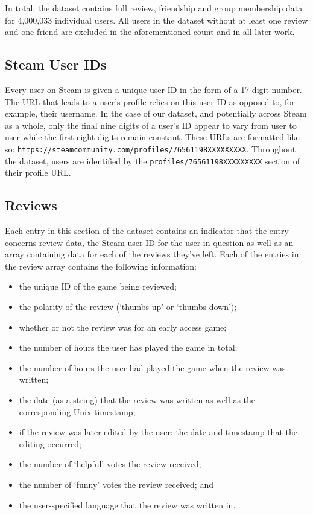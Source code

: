In total, the dataset contains full review, friendship and group membership data for 4,000,033 individual users. All users in the dataset without at least one review and one friend are excluded in the aforementioned count and in all later work.

\subsection{Steam User IDs} \label{sec:BG_Dataset_UIDs}

Every user on Steam is given a unique user ID in the form of a 17 digit number. The URL that leads to a user's profile relies on this user ID as opposed to, for example, their username. In the case of our dataset, and potentially across Steam as a whole, only the final nine digits of a user's ID appear to vary from user to user while the first eight digits remain constant. These URLs are formatted like so:  \texttt{https://steamcommunity.com/profiles/76561198XXXXXXXXX}. Throughout the dataset, users are identified by the \texttt{profiles/76561198XXXXXXXXX} section of their profile URL.

\subsection{Reviews} \label{sec:BG_Dataset_Revs}

Each entry in this section of the dataset contains an indicator that the entry concerns review data, the Steam user ID for the user in question as well as an array containing data for each of the reviews they've left. Each of the entries in the review array contains the following information:

\begin{itemize}
    \item the unique ID of the game being reviewed;
    \item the polarity of the review (`thumbs up' or `thumbs down');
    \item whether or not the review was for an early access game;
    \item the number of hours the user has played the game in total;
    \item the number of hours the user had played the game when the review was written;
    \item the date (as a string) that the review was written as well as the corresponding Unix timestamp;
    \item if the review was later edited by the user: the date and timestamp that the editing occurred;
    \item the number of `helpful' votes the review received;
    \item the number of `funny' votes the review received; and
    \item the user-specified language that the review was written in.
\end{itemize}

